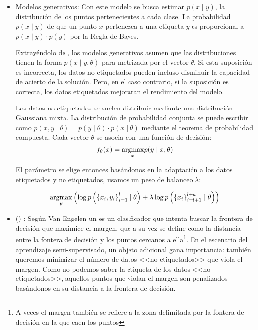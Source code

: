 \begin{itemize}
  \item Modelos generativos: Con este modelo se busca estimar $p(x \mid y)$, la distribución de los puntos pertenecientes a cada clase. La probabilidad $p(x \mid y)$ de que un punto $x$ pertenezca a una etiqueta $y$ es proporcional a $p(x \mid y) \cdot p(y)$ por la Regla de Bayes.

        Extrayéndolo de , los modelos generativos asumen que las distribuciones tienen la forma $p(x \mid y, \theta)$ para metrizada por el vector $\theta$. Si esta suposición es incorrecta, los datos no etiquetados pueden incluso disminuir la capacidad de acierto de la solución. Pero, en el caso contrario, si la suposición es correcta, los datos etiquetados mejoraran el rendimiento del modelo.

        Los datos no etiquetados se suelen distribuir mediante una distribución Gaussiana mixta. La distribución de probabilidad conjunta se puede escribir como $p(x,y \mid \theta) = p(y \mid \theta) \cdot p(x \mid \theta)$ mediante el teorema de probabilidad compuesta. Cada vector $\theta$ se asocia con una función de decisión: \[f_{\theta}(x) = \underset{x}{\operatorname{argmax}} p(y \mid x, \theta)\]

        El parámetro se elige entonces basándonos en la adaptación a los datos etiquetados y no etiquetados, usamos un peso de balanceo $\lambda$:

        \begin{equation*}
          \underset{\theta}{\operatorname{argmax}} \left( \log p\left(\left\{x_i, y_i\right\}_{i=1}^{l} \mid \theta\right)+\lambda \log p\left(\left\{x_i\right\}_{i=l+1}^{l+u} \mid \theta \right) \right)
        \end{equation*}

  \item {} () \label{SSL-SVM}: Según Van Engelen \et {} un  es un clasificador que intenta buscar la frontera de decisión que maximice el margen, que a su vez se define como la distancia entre la fontera de decisión y los puntos cercanos a ella\footnote{A veces el margen también se refiere a la zona delimitada por la fontera de decisión en la que caen los puntos}. En el escenario del aprendizaje semi-supervisado, un objeto adicional gana importancia: también queremos minimizar el número de datos <<no etiquetados>> que viola el margen. Como no podemos saber la etiqueta de los datos <<no etiquetados>>, aquellos puntos que violan el margen son penalizados basándonos en su distancia a la frontera de decisión.


\end{itemize}
